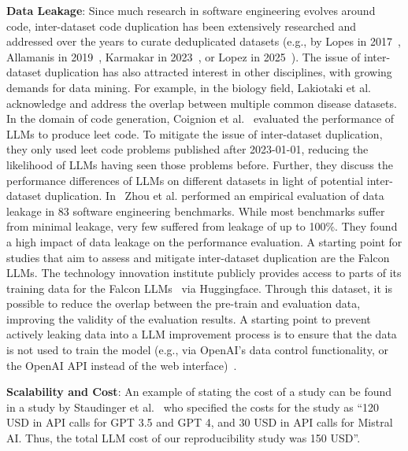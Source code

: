 \textbf{Data Leakage}:
Since much research in software engineering evolves around code, inter-dataset code duplication has been extensively researched and addressed over the years to curate deduplicated datasets (e.g., by Lopes in 2017~\cite{DBLP:journals/pacmpl/LopesMMSYZSV17}, Allamanis in 2019~\cite{DBLP:conf/oopsla/Allamanis19}, Karmakar in 2023~\cite{DBLP:journals/ese/KarmakarAR23}, or Lopez in 2025~\cite{DBLP:journals/tse/LopezCSSV25}).
The issue of inter-dataset duplication has also attracted interest in other disciplines, with growing demands for data mining. For example, in the biology field, Lakiotaki et al.~\cite{DBLP:journals/biodb/LakiotakiVTGT18} acknowledge and address the overlap between multiple common disease datasets. 
In the domain of code generation, Coignion et al.~\cite{DBLP:conf/ease/CoignionQR24} evaluated the performance of LLMs to produce leet code. To mitigate the issue of inter-dataset duplication, they only used leet code problems published after 2023-01-01, reducing the likelihood of LLMs having seen those problems before. Further, they discuss the performance differences of LLMs on different datasets in light of potential inter-dataset duplication.
In~\cite{zhou2025lessleakbenchinvestigationdataleakage} Zhou et al. performed an empirical evaluation of data leakage in 83 software engineering benchmarks. While most benchmarks suffer from minimal leakage, very few suffered from leakage of up to 100\%. They found a high impact of data leakage on the performance evaluation.
A starting point for studies that aim to assess and mitigate inter-dataset duplication are the Falcon LLMs. The technology innovation institute publicly provides access to parts of its training data for the Falcon LLMs~\cite{technology_innovation_institute_2023} via Huggingface. Through this dataset, it is possible to reduce the overlap between the pre-train and evaluation data, improving the validity of the evaluation results.
A starting point to prevent actively leaking data into a LLM improvement process is to ensure that the data is not used to train the model (e.g., via OpenAI's data control functionality, or the OpenAI API instead of the web interface)~\cite{DBLP:conf/eacl/BalloccuSLD24}.

\textbf{Scalability and Cost}:
An example of stating the cost of a study can be found in a study by Staudinger et al.~\cite{DBLP:conf/sigir-ap/StaudingerKPLH24} who specified the costs for the study as \enquote{120 USD in API calls for GPT 3.5 and GPT 4, and 30 USD in API calls for Mistral AI. Thus, the total LLM cost of our reproducibility study was 150 USD}.

